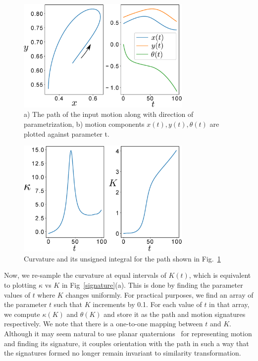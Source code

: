 \documentclass[twocolumn,10pt]{asme2ej}
\begin{document}
\begin{figure}
\centering
\includegraphics[width=240pt]{figure/fig_bspline.eps}
  \caption{a) The path of the input motion along with direction of parametrization, b) motion components $x(t), y(t), \theta(t)$ are plotted against parameter t.}
\label{bsplineFitting}
\end{figure}

\begin{figure}
\centering
\includegraphics[width=240pt]{figure/fig_curvatureK.eps}
  \caption{Curvature and its unsigned integral for the path shown in Fig.~\ref{bsplineFitting}}
\label{curvatureK}
\end{figure}

Now, we re-sample the curvature at equal intervals of $K(t)$, which is equivalent to plotting $\kappa$ vs $K$ in Fig~\ref{signature}(a).
This is done by finding the parameter values of $t$ where $K$ changes uniformly.
For practical purposes, we find an array of the parameter $t$ such that $K$ increments by 0.1.
For each value of $t$ in that array, we compute $\kappa(K)$ and $\theta(K)$ and store it as the path and motion signatures respectively.
We note that there is a one-to-one mapping between $t$ and $K$.
Although it may seem natural to use planar quaternions~\cite{McCarthy90, Bottema} for representing motion and finding its signature, it couples orientation with the path in such a way that the signatures formed no longer remain invariant to similarity transformation.
\end{document}
